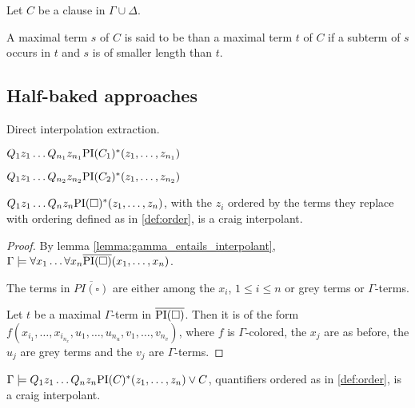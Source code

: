 \begin{defi}
	Let $C$ be a clause in $\Gamma \cup \Delta$. 

	A maximal term $s$ of $C$ is said to be  than a maximal term $t$ of $C$ if a subterm of $s$ occurs in $t$ and $s$ is of smaller length than $t$.
	\label{def:order}
\end{defi}


\subsection{Half-baked approaches}

\begin{defi}
	Direct interpolation extraction.

	\begin{prooftree}
	\end{prooftree}

	$Q_1 z_1 \ldots Q_{n_1} z_{n_1} \PI(C_1)^*(z_1, \ldots, z_{n_1})$

	$Q_1 z_1 \ldots Q_{n_2} z_{n_2} \PI(C_2)^*(z_1, \ldots, z_{n_2})$


\end{defi}

\begin{conj}
	$Q_1 z_1 \ldots Q_n z_n \PI(\square)^*(z_1, \ldots, z_n)$,
	with the $z_i$ ordered by the terms they replace with ordering defined as in \ref{def:order}, is a craig interpolant.
\end{conj}
\begin{proof}

	By lemma \ref{lemma:gamma_entails_interpolant}, $\Gamma \entails \forall x_1 \ldots \forall x_n \overline{\PI(\square)}(x_1, \ldots, x_n)$.

	The terms in $\overline{PI(\square)}$ are either among the $x_i$, $1 \leq i \leq n$ or grey terms or $\Gamma$-terms.

	Let $t$ be a maximal $\Gamma$-term in $\overline{\PI(\square)}$.
	Then it is of the form $f(x_{i_1}, \ldots, x_{i_{n_x}}, u_1, \ldots, u_{n_u}, v_1, \ldots, v_{n_v})$, where $f$ is $\Gamma$-colored, the $x_j$ are as before, the $u_j$ are grey terms and the $v_j$ are $\Gamma$-terms.

\end{proof}


\begin{prop}
	$\Gamma \entails Q_1 z_1 \ldots Q_n z_n \PI(C)^*(z_1, \ldots, z_n)  \lor C$, quantifiers ordered as in \ref{def:order}, is a craig interpolant.
\end{prop}

